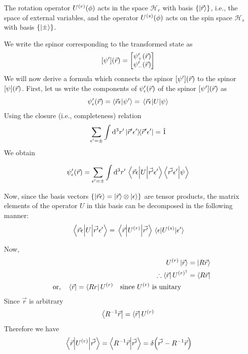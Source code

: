 The rotation operator $U^{(r)}\qty(\phi)$ acts in the space $\mathcal{H}_{r}$ with basis $\{\ket{\vec{r}}\}$, i.e., the space of external variables, and the operator $U^{(s)}\qty(\phi)$ acts on the spin space $\mathcal{H}_s$ with basis $\{\ket{\pm}\}$.


We write the spinor corresponding to the transformed state as
\begin{equation}
\qty[\psi^\prime] \qty(\vec{r}) = \mqty[\psi_{+}^\prime\qty(\vec{r}) \\ \psi_{-}^\prime\qty(\vec{r})]
\end{equation}
We will now derive a formula which connects the spinor $\qty[\psi^\prime] \qty(\vec{r})$ to the spinor $\qty[\psi] \qty(\vec{r})$.
First, let us write the components of $\psi_\epsilon^\prime\qty(\vec{r})$ of the spinor $\qty[\psi^\prime] \qty(\vec{r})$ as
\begin{equation}
 \psi_\epsilon^\prime\qty(\vec{r}) = \braket{\vec{r}\epsilon}{\psi^\prime} = \mel{\vec{r}\epsilon}{U}{\psi}
\end{equation}
Using the closure (i.e., completeness) relation
\begin{equation}
\sum_{\epsilon^\prime = \pm} \int \dd[3]{r^\prime} \ketbra{\vec{r}^\prime\epsilon^\prime}{\vec{r}^\prime\epsilon^\prime} = \hat{1}
\end{equation}
We obtain

\begin{align*}
\psi_\epsilon^\prime\qty(\vec{r}) =\sum_{\epsilon^\prime = \pm} \int \dd[3]{r^\prime} \mel{\vec{r}\epsilon}{U}{\vec{r^\prime}\epsilon^\prime} \braket{\vec{r^\prime}\epsilon^\prime}{\psi}
\end{align*}

Now, since the basis vectors $\{\ket{\vec{r}\epsilon} = \ket{\vec{r}} \otimes \ket{\epsilon}\}$ are tensor products, the matrix elements of the operator $U$ in this basis can be decomposed in the following manner:
\begin{equation}
\mel{\vec{r}\epsilon}{U}{\vec{r^\prime}\epsilon^\prime} = 
\mel{\vec{r}}{U^{(r)}}{\vec{r^\prime}}
\mel{\epsilon}{U^{(s)}}{\epsilon^\prime}
\end{equation}

Now, 
\begin{align*}
U^{(r)}\ket{\vec{r}} &= \ket{R\vec{r}} \\
\therefore \bra{\vec{r}} U^{(r)^\dagger} &= \bra{R \vec{r}} \\
\qq{or,} \bra{\vec{r}} = \bra{R r} U^{(r)} \qq{since $U^{(r)}$ is unitary}
\end{align*}
Since $\vec{r}$ is arbitrary
\begin{equation}
\bra{R^{-1} \vec{r}} = \bra{\vec{r}}  U^{(r)}
\end{equation}
Therefore we have
\begin{equation}
\mel{\vec{r}}{U^{(r)}}{\vec{r^\prime}} = \braket{R^{-1}\vec{r}}{\vec{r^\prime}} = \delta\qty(\vec{r^\prime} - R^{-1}\vec{r})
\end{equation}


